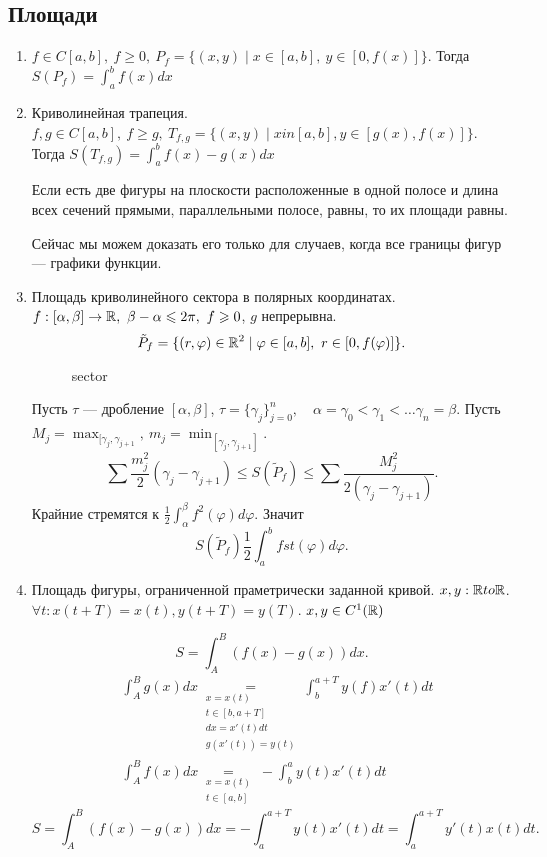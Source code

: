     \subsection{Площади}
    \begin{enumerate}
	\item $ f \in C[a, b], ~ f \ge 0, ~ P_f = \{(x, y) \mid x \in  [a, b], ~ y \in  [0, f(x)]\}$. Тогда $S(P_{f}) = \int_{a}^{b} f(x) dx $
	\item Криволинейная трапеция. $ f, g \in  C[a, b], ~ f \ge g, ~ T _{f, g} = \{ (x, y) \mid x in [a, b] , y \in  [g(x), f(x)] \}$.
	    Тогда $ S(T_{f, g}) = \int_{a}^{b} f(x) -g(x) dx $
	    \begin{cor}
		Если есть две фигуры на плоскости расположенные в одной полосе и длина всех сечений прямыми, параллельными полосе, равны, то их площади равны.

		Сейчас мы можем доказать его только для случаев, когда все границы фигур --- графики функции.
	    \end{cor}
	\item Площадь криволинейного сектора в полярных координатах.
	    $ f : [ \alpha  , \beta ] \to  \mathbb{R}, ~ \beta  - \alpha \leqslant  2 \pi, ~ f \geqslant 0$, $ g$ непрерывна.
	    \[
		\tilde P_f = \{ (r, \varphi ) \in  \mathbb{R}^2 \mid \varphi  \in  [a, b], ~ r \in  [0, f( \varphi )]\}
	    .\]
	    \begin{figure}[ht]
		\centering
		\caption{sector}
		\label{fig:sector}
	    \end{figure}
	    Пусть $ \tau$ --- дробление $ [ \alpha , \beta ]$, $ \tau  = \{ \gamma_j \}^{n}_{j = 0}, \quad \alpha = \gamma_0 < \gamma_1 < \ldots \gamma_n  = \beta $.
	    Пусть $ M _j= \max_{[\gamma_j, \gamma_{j+1}}, ~ m_j = \min_{[\gamma _j, \gamma_{j+1}]}$.
	    \[
		\sum \frac{m^2_j}{2}(\gamma _j - \gamma_{j+1}) \le  S(\tilde P_f) \le \sum \frac{M_j^2}{2 (\gamma _j - \gamma_{j+1})}
	    .\]
	    Крайние стремятся к $ \frac{1}{2} \int_{ \alpha }^{ \beta } f^2( \varphi )  d \varphi $.
	    Значит
	    \[
		S(\tilde P_f) \frac{1}{2} \int_{ a}^{b} fst( \varphi ) d \varphi
	    .\]
	\item Площадь фигуры, ограниченной праметрически заданной кривой.
	    $ x, y :  \mathbb{R} to \mathbb{R}$. $ \forall  t: x(t + T) = x(t) , y(t + T) = y(T)$. $ x, y \in  C^{1}(\mathbb{R})$
	    \begin{figure}[ht]
		\centering
		\label{fig:param}
	    \end{figure}
	    \[
		S = \int_{A}^{B}  (f(x) - g(x) ) dx
	    .\]
	    \begin{align*}
    &\int_{A}^{B}  g(x) dx \underset{\substack{x= x(t)\\ t \in [b, a+ T]\\ dx = x'(t) dt \\ g(x'(t)) = y(t)}}{=} \int_{b}^{a + T} y(f) x'(t) dt \\
    & \int_{A}^{B}  f(x) dx \underset{\substack{x=x(t)\\ t \in [a, b]}}{=} -\int_{b}^{a} y(t)  x'(t) dt
	    \end{align*}
	    \[
		S = \int_{A}^{B}  (f(x) - g(x) ) dx  = - \int_{a}^{ a+T} y(t) x'(t) dt  = \int_{a}^{ a+T}  y'(t) x(t) dt
	    .\]
    \end{enumerate}
